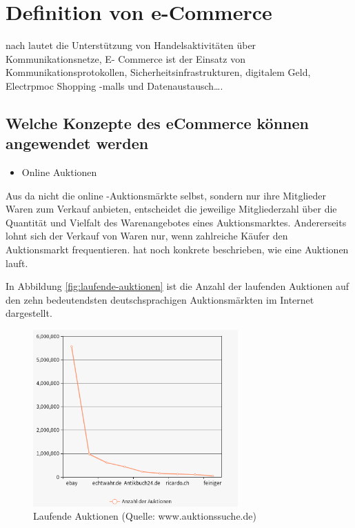 \section{Definition von  e-Commerce}

nach \textcite[S. 20]{merz:e-commerce} lautet  \glqq die Unterstützung von Handelsaktivitäten über Kommunikationsnetze\grqq, E- Commerce ist der Einsatz von Kommunikationsprotokollen, Sicherheitsinfrastrukturen, digitalem Geld, Electrpmoc Shopping -malls und Datenaustausch….\grqq


\subsection{Welche Konzepte des eCommerce können angewendet werden}

\begin{itemize}
\item Online Auktionen
\end{itemize}

Aus \textcite[Kapitel 4: Wirtschaftliche Bedeutung von Ebay, S. 71]{hinneburg} \glqq da nicht die online -Auktionsmärkte selbst, sondern nur ihre Mitglieder Waren zum Verkauf anbieten, entscheidet die jeweilige Mitgliederzahl über die Quantität und Vielfalt des Warenangebotes eines Auktionsmarktes. Andererseits lohnt sich der Verkauf von Waren nur, wenn zahlreiche Käufer den Auktionsmarkt frequentieren.\grqq \textcite[S. 72]{hinneburg} hat noch konkrete beschrieben, wie eine Auktionen lauft.

In Abbildung \vref{fig:laufende-auktionen} ist die Anzahl der laufenden Auktionen auf den zehn bedeutendsten deutschsprachigen Auktionsmärkten im Internet dargestellt.

\begin{figure}
	\centering
	\includegraphics[width=0.7\textwidth]{bilder/laufende-auktionen.png}
	\caption[Laufende Auktionen]{Laufende Auktionen (Quelle: www.auktionssuche.de)}
	\label{fig:laufende-auktionen}
\end{figure}

